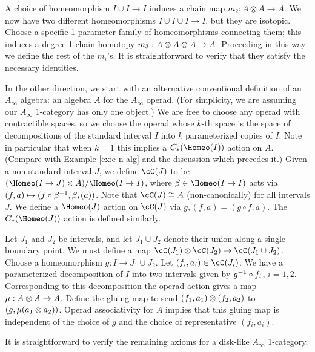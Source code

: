 A choice of homeomorphism $I\cup I \to I$ induces a chain map $m_2: A\otimes A\to A$.
We now have two different homeomorphisms $I\cup I\cup I \to I$, but they are isotopic.
Choose a specific 1-parameter family of homeomorphisms connecting them; this induces
a degree 1 chain homotopy $m_3:A\otimes A\otimes A\to A$.
Proceeding in this way we define the rest of the $m_i$'s.
It is straightforward to verify that they satisfy the necessary identities.

\medskip

In the other direction, we start with an alternative conventional definition of an $A_\infty$ algebra:
an algebra $A$ for the $A_\infty$ operad.
(For simplicity, we are assuming our $A_\infty$ 1-category has only one object.)
We are free to choose any operad with contractible spaces, so we choose the operad
whose $k$-th space is the space of decompositions of the standard interval $I$ into $k$
parameterized copies of $I$.
Note in particular that when $k=1$ this implies a $C_*(\Homeo(I))$ action on $A$.
(Compare with Example \ref{ex:e-n-alg} and the discussion which precedes it.)
Given a non-standard interval $J$, we define $\cC(J)$ to be
$(\Homeo(I\to J) \times A)/\Homeo(I\to I)$,
where $\beta \in \Homeo(I\to I)$ acts via $(f, a) \mapsto (f\circ \beta^{-1}, \beta_*(a))$.
Note that $\cC(J) \cong A$ (non-canonically) for all intervals $J$.
We define a $\Homeo(J)$ action on $\cC(J)$ via $g_*(f, a) = (g\circ f, a)$.
The $C_*(\Homeo(J))$ action is defined similarly.

Let $J_1$ and $J_2$ be intervals, and let $J_1\cup J_2$ denote their union along a single boundary point.
We must define a map $\cC(J_1)\ot\cC(J_2)\to\cC(J_1\cup J_2)$.
Choose a homeomorphism $g:I\to J_1\cup J_2$.
Let $(f_i, a_i)\in \cC(J_i)$.
We have a parameterized decomposition of $I$ into two intervals given by
$g^{-1} \circ f_i$, $i=1,2$.
Corresponding to this decomposition the operad action gives a map $\mu: A\otimes A\to A$.
Define the gluing map to send $(f_1, a_1)\otimes (f_2, a_2)$ to $(g, \mu(a_1\otimes a_2))$.
Operad associativity for $A$ implies that this gluing map is independent of the choice of
$g$ and the choice of representative $(f_i, a_i)$.

It is straightforward to verify the remaining axioms for a disk-like $A_\infty$ 1-category.







